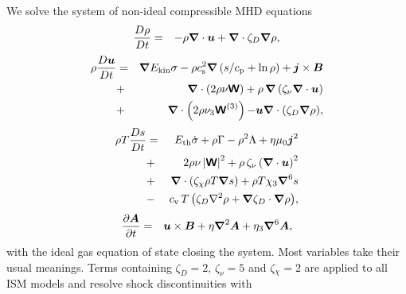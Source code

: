 \documentclass[preprint2]{aastex63}
\newcommand\ESK{E_{\rm kin}}
\newcommand\EST{E_{\rm th}}
\newcommand{\vect}[1]{{{\mbox{\boldmath $#1$}}}}%
\newcommand{\mathbfss}[1]{\textbf{\textsf{#1}}}
\begin{document}
 We solve the system of non-ideal compressible MHD equations
  \begin{eqnarray}
  \label{eq:mass}
    \frac{D\rho}{Dt} &=& 
    -\rho \vect\nabla \cdot \vect{u}
    +\vect\nabla \cdot\zeta_D\vect\nabla\rho,
  \end{eqnarray}
  \begin{eqnarray}
  \label{eq:mom}
    \rho\frac{D\vect{u}}{Dt} &=& 
    \vect\nabla{\ESK\sigma}
    -\rho c_{\rm s}^2\vect\nabla\left({s}/{c_{\rm p}}+\ln\rho\right)
    +\vect{j}\times\vect{B}
    \nonumber\\
    &+&\vect\nabla\cdot \left(2\rho\nu{\mathbfss W}\right)
    +\rho\,\vect\nabla\left(\zeta_{\nu}\vect\nabla \cdot \vect{u} \right)
    \nonumber\\
    &+&\vect\nabla\cdot \left(2\rho\nu_3{\mathbfss W}^{(3)}\right)
  {-\vect u\vect{\nabla}\cdot\left(\zeta_D\vect{\nabla}\rho\right)},
  \end{eqnarray}
  \begin{eqnarray}
  \label{eq:ent}
    \rho T\frac{D s}{Dt} &=&
     \EST\dot\sigma +\rho\Gamma
    -\rho^2\Lambda +\eta\mu_0\vect{j}^2 
    \nonumber\\
    &+&2 \rho \nu\left|{\mathbfss W}\right|^{2}
    +\rho\,\zeta_{\nu}\left(\vect\nabla \cdot \vect{u} \right)^2
    \nonumber\\
    &+&\vect\nabla\cdot\left(\zeta_\chi\rho T\vect\nabla s\right)
    +\rho T\chi_3\vect\nabla^6 s
    \nonumber\\
    &-& {c_{\rm{v}}\,T \left(
    \zeta_D\nabla^2\rho + \vect\nabla\zeta_D\cdot\vect\nabla\rho\right)},
  \end{eqnarray}
  \begin{eqnarray}
  \label{eq:ind}
    \frac{\partial \vect{A}}{\partial t} &=&
    \vect{u}\times\vect{B}
    +\eta\vect\nabla^2\vect{A}
    +\eta_3\vect\nabla^6\vect{A},
  \end{eqnarray}
 with the ideal gas equation of state closing the system.
 Most variables take their usual meanings.
 Terms containing $\zeta_D{=2},\,\zeta_\nu{=5}$ and $\zeta{_\chi=2}$
 {are applied to all ISM models and} resolve shock discontinuities with
\end{document}
